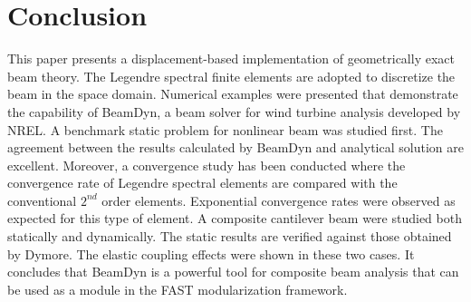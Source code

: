 \section{Conclusion}
This paper presents a displacement-based implementation of geometrically exact beam theory. The Legendre spectral finite elements are adopted to discretize the beam in the space domain. Numerical examples were presented that demonstrate the capability of BeamDyn, a beam solver for wind turbine analysis developed by NREL. A benchmark static problem for nonlinear beam was studied first. The agreement between the results calculated by BeamDyn and analytical solution are excellent. Moreover, a convergence study has been conducted where the convergence rate of Legendre spectral elements are compared with the conventional $2^{nd}$ order elements. Exponential convergence rates were observed as expected for this type of element. A composite cantilever beam were studied both statically and dynamically. The static results are verified against those obtained by Dymore. The elastic coupling effects were shown in these two cases. It concludes that BeamDyn is a powerful tool for composite beam analysis that can be used as a module in the FAST modularization framework.

